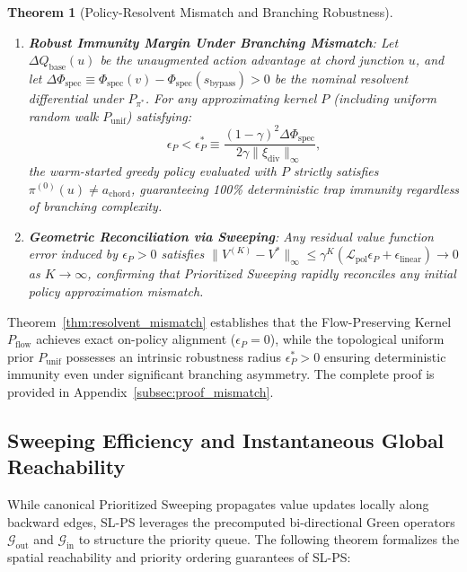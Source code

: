 \documentclass[11pt,a4paper]{article}
\newtheorem{theorem}{Theorem}
\begin{document}
\begin{theorem}[Policy-Resolvent Mismatch and Branching Robustness]
\begin{enumerate}
    \item \textbf{Robust Immunity Margin Under Branching Mismatch}: Let $\Delta Q_{\text{base}}(u)$ be the unaugmented action advantage at chord junction $u$, and let $\Delta \Phi_{\text{spec}} \equiv \Phi_{\text{spec}}(v) - \Phi_{\text{spec}}(s_{\text{bypass}}) > 0$ be the nominal resolvent differential under $P_{\pi^*}$. For any approximating kernel $P$ (including uniform random walk $P_{\text{unif}}$) satisfying:
    \begin{equation}
    \label{eq:robust_policy_margin}
    \epsilon_P < \epsilon_P^* \equiv \frac{(1 - \gamma)^2 \Delta \Phi_{\text{spec}}}{2 \gamma \|\xi_{\text{div}}\|_\infty},
    \end{equation}
    the warm-started greedy policy evaluated with $P$ strictly satisfies $\pi^{(0)}(u) \ne a_{\text{chord}}$, guaranteeing 100\% deterministic trap immunity regardless of branching complexity.
    
    \item \textbf{Geometric Reconciliation via Sweeping}: Any residual value function error induced by $\epsilon_P > 0$ satisfies $\|V^{(K)} - V^*\|_\infty \le \gamma^K (\mathcal{L}_{\text{pol}} \epsilon_P + \epsilon_{\text{linear}}) \to 0$ as $K \to \infty$, confirming that Prioritized Sweeping rapidly reconciles any initial policy approximation mismatch.
\end{enumerate}
\end{theorem}

Theorem~\ref{thm:resolvent_mismatch} establishes that the Flow-Preserving Kernel $P_{\text{flow}}$ achieves exact on-policy alignment ($\epsilon_P = 0$), while the topological uniform prior $P_{\text{unif}}$ possesses an intrinsic robustness radius $\epsilon_P^* > 0$ ensuring deterministic immunity even under significant branching asymmetry. The complete proof is provided in Appendix~\ref{subsec:proof_mismatch}.

\subsection{Sweeping Efficiency and Instantaneous Global Reachability}
\label{subsec:sweeping_efficiency}

While canonical Prioritized Sweeping propagates value updates locally along backward edges, SL-PS leverages the precomputed bi-directional Green operators $\mathcal{G}_{\text{out}}$ and $\mathcal{G}_{\text{in}}$ to structure the priority queue. The following theorem formalizes the spatial reachability and priority ordering guarantees of SL-PS:
\end{document}
